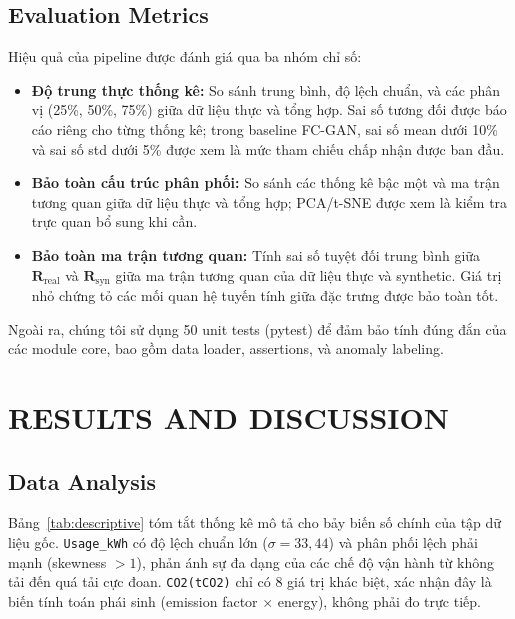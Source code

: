 \documentclass[conference]{IEEEtran}
\begin{document}
\subsection{Evaluation Metrics}

Hiệu quả của pipeline được đánh giá qua ba nhóm chỉ số:
\begin{itemize}
    \item \textbf{Độ trung thực thống kê:} So sánh trung bình, độ lệch chuẩn, và các phân vị (25\%, 50\%, 75\%) giữa dữ liệu thực và tổng hợp.
    Sai số tương đối được báo cáo riêng cho từng thống kê; trong baseline FC-GAN, sai số mean dưới 10\% và sai số std dưới 5\% được xem là mức tham chiếu chấp nhận được ban đầu.
    \item \textbf{Bảo toàn cấu trúc phân phối:} So sánh các thống kê bậc một và ma trận tương quan giữa dữ liệu thực và tổng hợp; PCA/t-SNE được xem là kiểm tra trực quan bổ sung khi cần.
    \item \textbf{Bảo toàn ma trận tương quan:} Tính sai số tuyệt đối trung bình giữa $\mathbf{R}_{\text{real}}$ và $\mathbf{R}_{\text{syn}}$
giữa ma trận tương quan của dữ liệu thực và synthetic.
Giá trị nhỏ chứng tỏ các mối quan hệ tuyến tính giữa đặc trưng được bảo toàn tốt.
\end{itemize}

Ngoài ra, chúng tôi sử dụng 50 unit tests (pytest) để đảm bảo tính đúng đắn của các module core,
bao gồm data loader, assertions, và anomaly labeling.


\section{RESULTS AND DISCUSSION}
\label{sec:results}

\subsection{Data Analysis}

Bảng~\ref{tab:descriptive} tóm tắt thống kê mô tả cho bảy biến số chính của tập dữ liệu gốc.
\texttt{Usage\_kWh} có độ lệch chuẩn lớn ($\sigma = 33{,}44$) và phân phối lệch phải mạnh (skewness $> 1$),
phản ánh sự đa dạng của các chế độ vận hành từ không tải đến quá tải cực đoan.
\texttt{CO2(tCO2)} chỉ có 8 giá trị khác biệt, xác nhận đây là biến tính toán phái sinh (emission factor $\times$ energy),
không phải đo trực tiếp.
\end{document}
